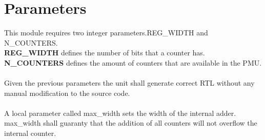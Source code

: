 \section{Parameters}
\label{chapter3}
This module requires two integer parameters.REG\_WIDTH and N\_COUNTERS. \\
\textbf{REG\_WIDTH} defines the number of bits that a counter has.\\
\textbf{N\_COUNTERS} defines the amount of counters that are available in the PMU.\\
\\
Given the previous parameters the unit shall generate correct RTL without any manual modification to the source code.\\
\\
A local parameter called max\_width sets the width of the internal adder. max\_width shall guaranty that the addition of all counters will not overflow the internal counter.

